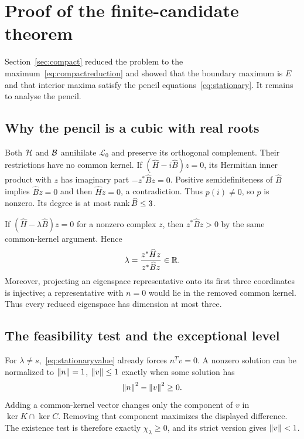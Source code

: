 \section{Proof of the finite-candidate theorem}
\label{sec:proof-general}

Section~\ref{sec:compact} reduced the problem to the maximum~\eqref{eq:compactreduction} and showed that the boundary maximum is $E$ and that interior maxima satisfy the pencil equations~\eqref{eq:stationary}. It remains to analyse the pencil.

\subsection{Why the pencil is a cubic with real roots}

Both $\mathcal H$ and $\mathcal B$ annihilate $\mathcal L_0$ and preserve its orthogonal complement. Their restrictions have no common kernel. If
$(\widehat H-i\widehat B)z=0$, its Hermitian inner product with $z$ has imaginary part $-z^*\widehat Bz=0$. Positive semidefiniteness of $\widehat B$ implies $\widehat Bz=0$ and then $\widehat Hz=0$, a contradiction. Thus $p(i)\ne0$, so $p$ is nonzero. Its degree is at most $\operatorname{rank}\widehat B\le3$.

If $(\widehat H-\lambda\widehat B)z=0$ for a nonzero complex $z$, then $z^*\widehat Bz>0$ by the same common-kernel argument. Hence
\begin{equation}
 \lambda=\frac{z^*\widehat Hz}{z^*\widehat Bz}\in\mathbb R.
\end{equation}
Moreover, projecting an eigenspace representative onto its first three coordinates is injective; a representative with $n=0$ would lie in the removed common kernel. Thus every reduced eigenspace has dimension at most three.

\subsection{The feasibility test and the exceptional level}
\label{sec:phase}

For $\lambda\ne s$,~\eqref{eq:stationaryvalue} already forces $n^Tv=0$. A nonzero solution can be normalized to $\left\lVert n\right\rVert=1$, $\left\lVert v\right\rVert\le1$ exactly when some solution has
\begin{equation}
 \left\lVert n\right\rVert^2-\left\lVert v\right\rVert^2\ge0.
\end{equation}
Adding a common-kernel vector changes only the component of $v$ in $\ker K\cap\ker C$. Removing that component maximizes the displayed difference. The existence test is therefore exactly $\chi_\lambda\ge0$, and its strict version gives $\left\lVert v\right\rVert<1$.

